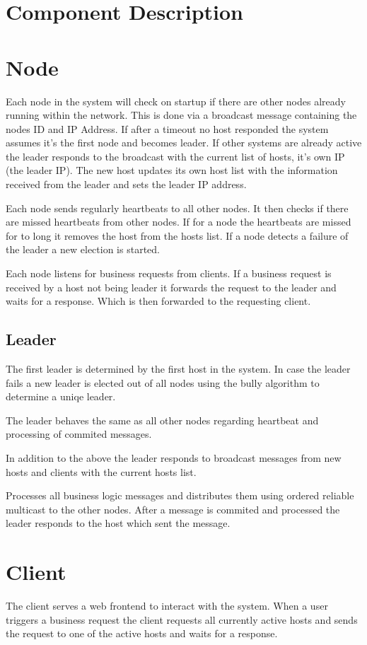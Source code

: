 \chapter{Component Description}\label{ch:ComponentDescription}

\chapter{Node}\label{ch:Node}
Each node in the system will check on startup if there are other nodes already running within the network. This is done via a broadcast message containing the nodes ID and IP Address. If after a timeout no host responded the system assumes it's the first node and becomes leader. If other systems are already active the leader responds to the broadcast with the current list of hosts, it's own IP (the leader IP). The new host updates its own host list with the information received from the leader and sets the leader IP address. 

Each node sends regularly heartbeats to all other nodes. It then checks if there are missed heartbeats from other nodes. If for a node the heartbeats are missed for to long it removes the host from the hosts list.
If a node detects a failure of the leader a new election is started.

Each node listens for business requests from clients. If a business request is received by a host not being leader it forwards the request to the leader and waits for a response. Which is then forwarded to the requesting client.

\section{Leader}\label{sec:Leader}
The first leader is determined by the first host in the system. 
In case the leader fails a new leader is elected out of all nodes using the bully algorithm to determine a uniqe leader.

The leader behaves the same as all other nodes regarding heartbeat and processing of commited messages.

In addition to the above the leader responds to broadcast messages from new hosts and clients with the current hosts list.

Processes all business logic messages and distributes them using ordered reliable multicast to the other nodes. After a message is commited and processed the leader responds to the host which sent the message.



\chapter{Client}\label{sec:Client}
The client serves a web frontend to interact with the system. When a user triggers a business request the client requests all currently active hosts and sends the request to one of the active hosts and waits for a response. 